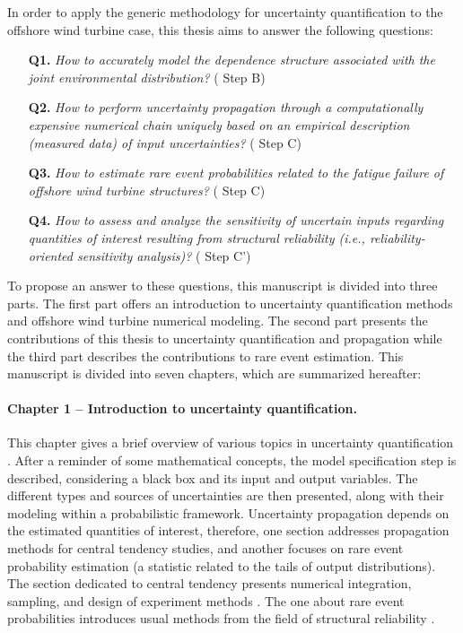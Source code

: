 In order to apply the generic methodology for uncertainty quantification to the offshore wind turbine case, this thesis aims to answer the following questions: 
\begin{itemize}
    \item[\textbf{Q1.}] \textit{
    How to accurately model the dependence structure associated with the joint environmental distribution? 
    } ( Step B)
    \item[\textbf{Q2.}] \textit{
    How to perform uncertainty propagation through a computationally expensive numerical chain uniquely based on an empirical description (measured data) of input uncertainties?
    } ( Step C)
    \item[\textbf{Q3.}] \textit{
    How to estimate rare event probabilities related to the fatigue failure of offshore wind turbine structures?
    } ( Step C)
    \item[\textbf{Q4.}] \textit{
    How to assess and analyze the sensitivity of uncertain inputs regarding quantities of interest resulting from structural reliability (i.e., reliability-oriented sensitivity analysis)? 
    } ( Step C')
\end{itemize}

To propose an answer to these questions, this manuscript is divided into three parts. 
The first part offers an introduction to uncertainty quantification methods and offshore wind turbine numerical modeling. 
The second part presents the contributions of this thesis to uncertainty quantification and propagation while the third part describes the contributions to rare event estimation. 
This manuscript is divided into seven chapters, which are summarized hereafter: 

\paragraph{Chapter 1 -- Introduction to uncertainty quantification.} 
This chapter gives a brief overview of various topics in uncertainty quantification \citep{sullivan_2015}. 
After a reminder of some mathematical concepts, the model specification step is described, considering a black box and its input and output variables. 
The different types and sources of uncertainties are then presented, along with their modeling within a probabilistic framework. 
Uncertainty propagation depends on the estimated quantities of interest, therefore, one section addresses propagation methods for central tendency studies, 
and another focuses on rare event probability estimation (a statistic related to the tails of output distributions). 
The section dedicated to central tendency presents numerical integration, sampling, and design of experiment methods \citep{fang_liu_2018}. 
The one about rare event probabilities introduces usual methods from the field of structural reliability \citep{lemaire_2009,MorioBalesdent2015}. 

